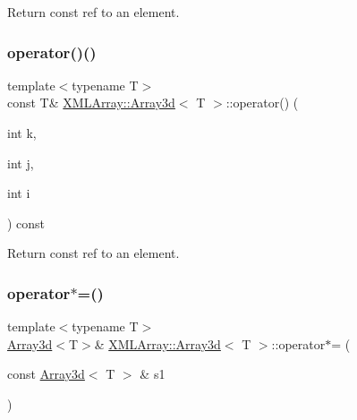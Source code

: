 Return const ref to an element. 

\mbox{\label{classXMLArray_1_1Array3d_a177102edcf9ac47e8dbf50311d9e5549}} 
\subsubsection{\texorpdfstring{operator()()}{operator()()}\hspace{0.1cm}{\footnotesize\ttfamily [6/6]}}
{\footnotesize\ttfamily template$<$typename T$>$ \\
const T\& \mbox{\hyperlink{classXMLArray_1_1Array3d}{X\+M\+L\+Array\+::\+Array3d}}$<$ T $>$\+::operator() (\begin{DoxyParamCaption}\item[{int}]{k,  }\item[{int}]{j,  }\item[{int}]{i }\end{DoxyParamCaption}) const\hspace{0.3cm}{\ttfamily [inline]}}



Return const ref to an element. 

\mbox{\label{classXMLArray_1_1Array3d_a8084893bc2fd7c37f656d6eec21189eb}} 
\subsubsection{\texorpdfstring{operator$\ast$=()}{operator*=()}\hspace{0.1cm}{\footnotesize\ttfamily [1/6]}}
{\footnotesize\ttfamily template$<$typename T$>$ \\
\mbox{\hyperlink{classXMLArray_1_1Array3d}{Array3d}}$<$T$>$\& \mbox{\hyperlink{classXMLArray_1_1Array3d}{X\+M\+L\+Array\+::\+Array3d}}$<$ T $>$\+::operator$\ast$= (\begin{DoxyParamCaption}\item[{const \mbox{\hyperlink{classXMLArray_1_1Array3d}{Array3d}}$<$ T $>$ \&}]{s1 }\end{DoxyParamCaption})\hspace{0.3cm}{\ttfamily [inline]}}



